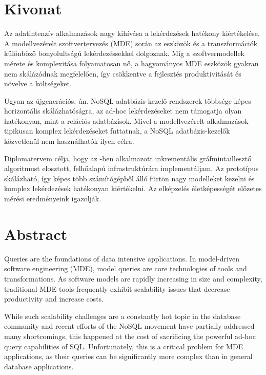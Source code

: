 \chapter*{Kivonat}

Az adatintenzív alkalmazások nagy kihívása a lekérdezések hatékony kiértékelése. A modellvezérelt szoftvertervezés (MDE) során az eszközök és a transzformációk különböző bonyolultságú lekérdezéssekkel dolgoznak. Míg a szoftvermodellek mérete és komplexitása folyamatosan nő, a hagyományos MDE eszközök gyakran nem skálázódnak megfelelően, így csökkentve a fejlesztés produktivitását és növelve a költségeket.

Ugyan az újgenerációs, ún. NoSQL adatbázis-kezelő rendszerek többsége képes horizontális skálázhatóságra, az ad-hoc lekérdezéseket nem támogatja olyan hatékonyan, mint a relációs adatbázisok. Mivel a modellvezérelt alkalmazások tipikusan komplex lekérdezéseket futtatnak, a NoSQL adatbázis-kezelők közvetlenül nem használhatók ilyen célra.

Diplomatervem célja, hogy az \incquery{}-ben alkalmazott inkrementális gráfmintaillesztő algoritmust elosztott, felhőalapú infrastruktúrára implementáljam. Az \incqueryD{} prototípus skálázható, így képes több számítógépből álló fürtön nagy modelleket kezelni és komplex lekérdezések hatékonyan kiértékelni. Az elképzelés életképességét előzetes mérési eredményeink igazolják.

\vfill

\chapter*{Abstract}

Queries are the foundations of data intensive applications. In model-driven software engineering (MDE), model queries are core technologies of tools and transformations. As software models are rapidly increasing in size and complexity, traditional MDE tools frequently exhibit scalability issues that decrease productivity and increase costs.

While such scalability challenges are a constantly hot topic in the database community and recent efforts of the NoSQL movement have partially addressed many shortcomings, this happened at the cost of sacrificing the powerful ad-hoc query capabilities of SQL. Unfortunately, this is a critical problem for MDE applications, as their queries can be significantly more complex than in general database applications.

